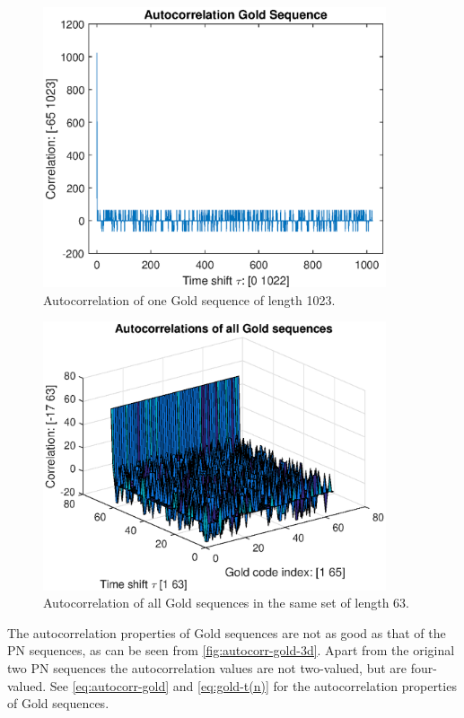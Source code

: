 \begin{figure}[h]
	\centering
	\includegraphics[width=0.9\textwidth]{chapters/cdma-chapters/autocorr-gold.eps}
	\caption{Autocorrelation of one Gold sequence of length 1023.}
	\label{fig:autocorr-gold}
\end{figure}


\begin{figure}[h]
	\centering
	\includegraphics[width=0.9\textwidth]{chapters/cdma-chapters/autocorr-gold-3d.eps}
	\caption{Autocorrelation of all Gold sequences in the same set of length 63.}
	\label{fig:autocorr-gold-3d}
\end{figure}




The autocorrelation properties of Gold sequences are not as good as that of the PN sequences, as can be seen from \autoref{fig:autocorr-gold-3d}.
Apart from the original two PN sequences the autocorrelation values are not two-valued, but are four-valued.
See \autoref{eq:autocorr-gold} and \autoref{eq:gold-t(n)} for the autocorrelation properties of Gold sequences.

